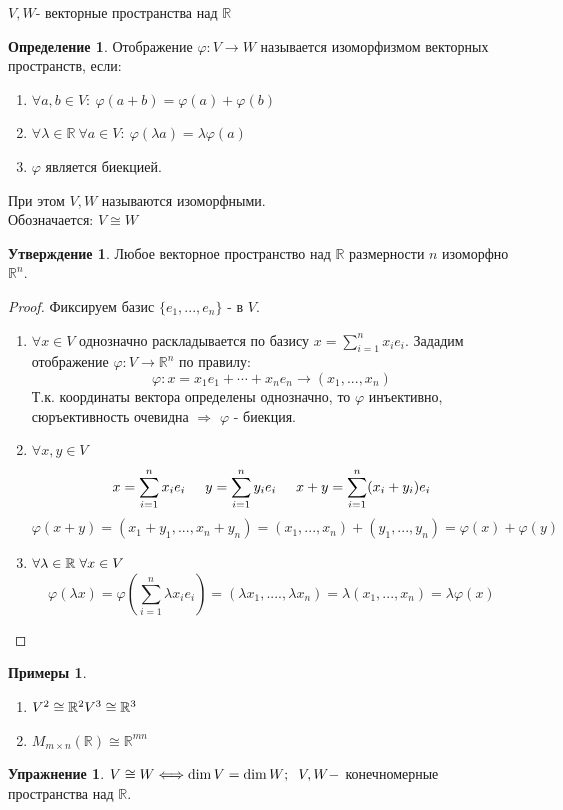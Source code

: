 \documentclass[a4paper, 12pt]{article}
\newcommand{\R}{\mathbb R}
\renewcommand{\phi}{\varphi}
\newcommand\tab[1][.5cm]{\hspace*{#1}}
\theoremstyle{definition}
\newtheorem*{definition}{Определение}
\newtheorem*{subtheorem}{Утверждение}
\newtheorem*{example}{Примеры}
\newtheorem*{Exercise}{Упражнение}
\begin{document}
  $V, W$- векторные пространства над $\R$ 
  \begin{definition}
    Отображение $\phi: V \to W$ называется изоморфизмом векторных пространств, если:
    \begin{enumerate}
      \item $\forall a, b \in V: \ \phi(a+b) = \phi(a) + \phi(b)$
      \item $\forall \lambda \in \R \ \forall a \in V: \ \phi(\lambda a) = \lambda \phi(a)$
      \item $\phi$ является биекцией. 
    \end{enumerate}
    При этом $V, W$ называются изоморфными.\\ 
    Обозначается: $V \cong W$ 
  \end{definition} 
  \begin{subtheorem}
    Любое векторное  пространство над $\R$ размерности $n$ изоморфно $\R^n$. 
  \end{subtheorem} 
  \begin{proof}
    Фиксируем базис $\{e_1,...,e_n\}$ - в $V$.
    \begin{enumerate}
      \item $\forall x \in V$ однозначно раскладывается по базису $x = \sum \limits_{i=1}^{n} x_ie_i$. 
    Зададим отображение  $\phi: V \to \R^n$ по правилу:
    $$\phi: x = x_1e_1 + \cdots + x_ne_n \to (x_1,...,x_n)$$
    Т.к. координаты вектора определены однозначно, то $\phi$ инъективно, сюръективность очевидна $\Longrightarrow $ $\phi$ - биекция.
    \item $\forall x,y \in V$
    $$x = \sum \limits_{i=1}^{n} x_ie_i \tab[0.5cm] y = \sum \limits_{i=1}^{n} y_ie_i \tab[0.5cm]
    x + y = \sum \limits_{i=1}^{n} (x_i + y_i)e_i$$ 
    $$\phi(x+y) = (x_1 + y_1,...,x_n+y_n) = (x_1,...,x_n) + (y_1,...,y_n) = \phi(x) + \phi(y)$$ 
    \item $\forall \lambda \in \R \tab[0.1cm] \forall x \in V$
    $$\phi(\lambda x) = \phi(\sum \limits_{i=1}^{n} \lambda x_ie_i) = (\lambda x_1,....,\lambda x_n) = \lambda (x_1,...,x_n) = \lambda \phi(x)$$  
    \end{enumerate}
  \end{proof} 

  \begin{example}\end{example}
  \begin{enumerate}
    \item $V^2 \cong \R^2 \\ V^3 \cong \R^3$ 
    \item $M_{m \times n}(\R) \cong \R^{mn}$
  \end{enumerate}
  \begin{Exercise}
    $V \cong W \Longleftrightarrow \dim V = \dim W; \tab[0.2cm] V,W - $ конечномерные пространства над $\R$.  
  \end{Exercise}
\end{document}
